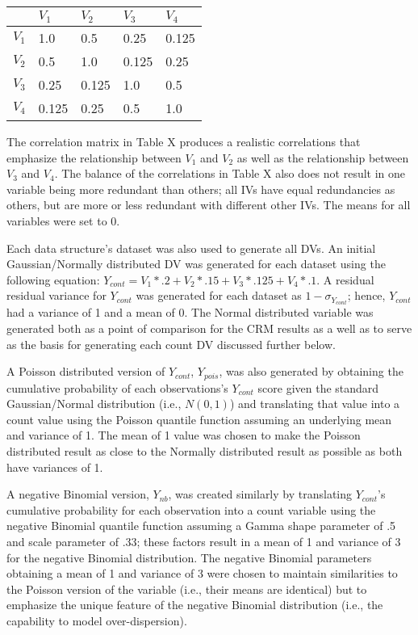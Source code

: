 \documentclass[ShortAfour,times,sageapa]{sagej}
\begin{document}
	\medskip
	
	\begin{center}
	\begin{tabular}[5]{r|llll}
		& $V_1$ & $V_2$ & $V_3$ & $V_4$ \\
		\toprule
		$V_1$ & 1.0 & 0.5 & 0.25 & 0.125 \\
		$V_2$ & 0.5 & 1.0 & 0.125 & 0.25 \\
		$V_3$ & 0.25 & 0.125 & 1.0 & 0.5 \\
		$V_4$ & 0.125 & 0.25 & 0.5 & 1.0
	\end{tabular}
	\end{center}
	
	\medskip
	
	The correlation matrix in Table X produces a realistic correlations that emphasize the relationship between $V_1$ and $V_2$ as well as the relationship between $V_3$ and $V_4$.  
	The balance of the correlations in Table X also does not result in one variable being more redundant than others; all IVs have equal redundancies as others, but are more or less redundant with different other IVs.	The means for all variables were set to 0.
	
	Each data structure's dataset was also used to generate all DVs.  An initial Gaussian/Normally distributed DV was generated for each dataset using the following equation: $Y_{cont} = V_1*.2 + V_2*.15 + V_3*.125 + V_4*.1$.  A residual residual variance for $Y_{cont}$ was generated for each dataset as $1 - \sigma_{Y_{cont}}$; hence, $Y_{cont}$ had a variance of 1 and a mean of 0.  
	The Normal distributed variable was generated both as a point of comparison for the CRM results as a well as to serve as the basis for generating each count DV discussed further below.
	
	A Poisson distributed version of $Y_{cont}$, $Y_{pois}$, was also generated by obtaining the cumulative probability of each observations's $Y_{cont}$ score given the standard Gaussian/Normal distribution (i.e., $N(0,1)$) and translating that value into a count value using the Poisson quantile function assuming an underlying mean and variance of 1.  
	The mean of 1 value was chosen to make the Poisson distributed result as close to the Normally distributed result as possible as both have variances of 1.	
	
	A negative Binomial version, $Y_{nb}$, was created similarly by translating $Y_{cont}$'s cumulative probability for each observation into a count variable using the negative Binomial quantile function assuming a Gamma shape parameter of .5 and scale parameter of .33; these factors result in a mean of 1 and variance of 3 for the negative Binomial distribution.  
	The negative Binomial parameters obtaining a mean of 1 and variance of 3 were chosen to maintain similarities to the Poisson version of the variable (i.e., their means are identical) but to emphasize the unique feature of the negative Binomial distribution (i.e., the capability to model over-dispersion).  
	
\end{document}
